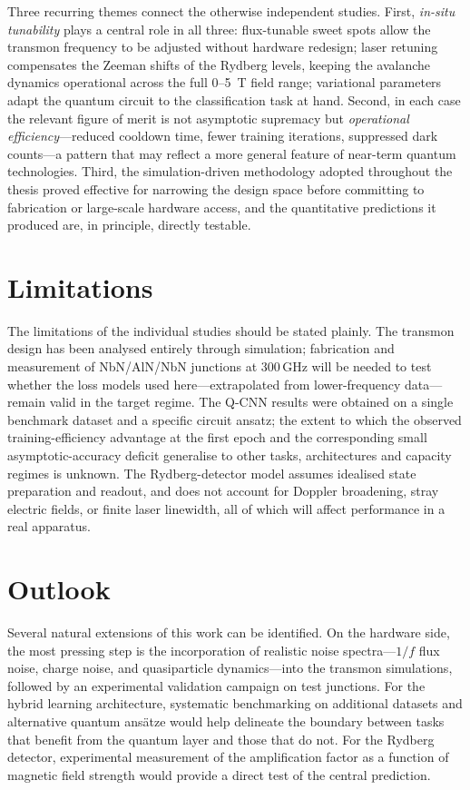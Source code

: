 Three recurring themes connect the otherwise independent studies.
First, \emph{in-situ tunability} plays a central role in all three:
flux-tunable sweet spots allow the transmon frequency to be adjusted
without hardware redesign; laser retuning compensates the Zeeman shifts of the Rydberg
levels, keeping the avalanche dynamics operational across the full
0--5~T field range; variational parameters
adapt the quantum circuit to the classification task at hand.
Second, in each case the relevant figure of merit is not asymptotic
supremacy but \emph{operational efficiency}---reduced cooldown time,
fewer training iterations, suppressed dark counts---a pattern that may
reflect a more general feature of near-term quantum technologies.
Third, the simulation-driven methodology adopted throughout the thesis
proved effective for narrowing the design space before committing to
fabrication or large-scale hardware access, and the quantitative
predictions it produced are, in principle, directly testable.

\section{Limitations}

The limitations of the individual studies should be stated plainly.
The transmon design has been analysed entirely through simulation;
fabrication and measurement of NbN/AlN/NbN junctions at 300\,GHz will
be needed to test whether the loss models used here---extrapolated
from lower-frequency data---remain valid in the target regime.  The
Q-CNN results were obtained on a single benchmark dataset and a
specific circuit ansatz; the extent to which the observed
training-efficiency advantage at the first epoch and the corresponding
small asymptotic-accuracy deficit generalise to other tasks,
architectures and capacity regimes is unknown.
The Rydberg-detector model assumes idealised state preparation and
readout, and does not account for Doppler broadening, stray electric
fields, or finite laser linewidth, all of which will affect
performance in a real apparatus.

\section{Outlook}

Several natural extensions of this work can be identified.  On the
hardware side, the most pressing step is the incorporation of
realistic noise spectra---$1/f$ flux noise, charge noise, and
quasiparticle dynamics---into the transmon simulations, followed by
an experimental validation campaign on test junctions.  For the hybrid
learning architecture, systematic benchmarking on additional datasets
and alternative quantum ansätze would help delineate the boundary
between tasks that benefit from the quantum layer and those that
do not.  For the Rydberg detector, experimental measurement of the
amplification factor as a function of magnetic field strength would
provide a direct test of the central prediction.

